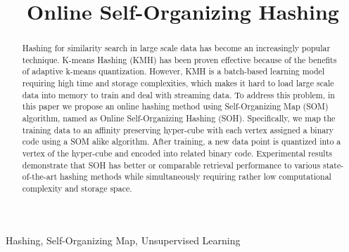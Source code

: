 \documentclass{article}
\begin{document}
\sloppy

\def\x{{\mathbf x}}
\def\L{{\cal L}}


\title{Online Self-Organizing Hashing}
%

\address{Key Laboratory of Shanghai Education Commission for Intelligent Interaction and Cognitive Engineering\\
Department of Computer Science and Engineering\\	
Shanghai Jiao Tong University, P.R.China \\
chenjunxuan@sjtu.edu.cn, dsamuel@sjtu.edu.cn, htlu@sjtu.edu.cn}


%
%
%

\maketitle


%
\begin{abstract}
Hashing for similarity search in large scale data has become an increasingly popular technique. K-means Hashing (KMH) has been proven effective because of the benefits of adaptive k-means quantization. However, KMH is a batch-based learning model requiring high time and storage complexities, which makes it hard to load large scale data into memory to train and deal with streaming data. To address this problem, in this paper we propose an online hashing method using Self-Organizing Map (SOM) algorithm, named as Online Self-Organizing Hashing (SOH). Specifically, we map the training data to an affinity preserving hyper-cube with each vertex assigned a binary code using a SOM alike algorithm. After training, a new data point is quantized into a vertex of the hyper-cube and encoded into related binary code. Experimental results demonstrate that SOH has better or comparable retrieval performance to various state-of-the-art hashing methods while simultaneously requiring rather low computational complexity and storage space.
\end{abstract}
%
\begin{keywords}
Hashing, Self-Organizing Map, Unsupervised Learning
\end{keywords}
%
\end{document}
